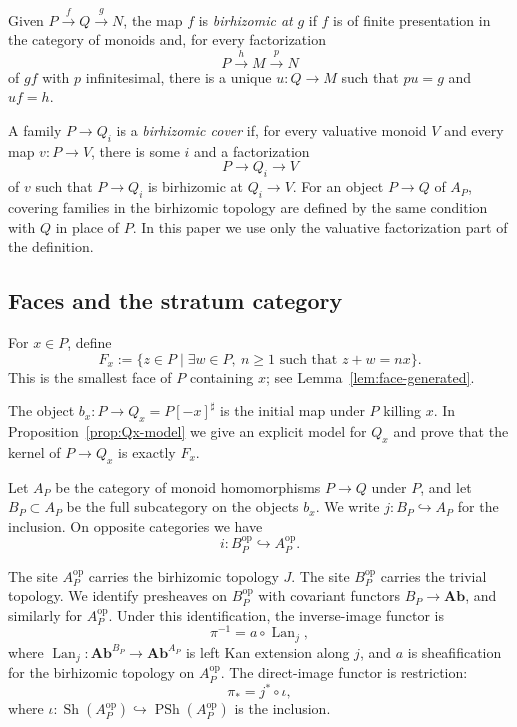 \documentclass[12pt]{article}
\theoremstyle{definition}
\theoremstyle{remark}
\numberwithin{equation}{section}
\newcommand{\op}{\mathrm{op}}
\newcommand{\Ab}{\mathbf{Ab}}
\newcommand{\PSh}{\operatorname{PSh}}
\newcommand{\Sh}{\operatorname{Sh}}
\newcommand{\Lan}{\operatorname{Lan}}
\begin{document}
Given \(P\xrightarrow{f}Q\xrightarrow{g}N\), the map \(f\) is \emph{birhizomic at} \(g\) if \(f\) is of finite presentation in the category of monoids and, for every factorization
\[
P\xrightarrow{h}M\xrightarrow{p}N
\]
of \(gf\) with \(p\) infinitesimal, there is a unique \(u:Q\to M\) such that \(pu=g\) and \(uf=h\).

A family \(P\to Q_i\) is a \emph{birhizomic cover} if, for every valuative monoid \(V\) and every map \(v:P\to V\), there is some \(i\) and a factorization
\[
P\longrightarrow Q_i\longrightarrow V
\]
of \(v\) such that \(P\to Q_i\) is birhizomic at \(Q_i\to V\).  For an object \(P\to Q\) of \(A_P\), covering families in the birhizomic topology are defined by the same condition with \(Q\) in place of \(P\).  In this paper we use only the valuative factorization part of the definition.

\subsection{Faces and the stratum category}

For \(x\in P\), define
\[
F_x := \{z\in P \mid \exists w\in P,\ n\geq 1\text{ such that } z+w=nx\}.
\]
This is the smallest face of \(P\) containing \(x\); see Lemma~\ref{lem:face-generated}.

The object \(b_x:P\to Q_x=P[-x]^\sharp\) is the initial map under \(P\) killing \(x\).  In Proposition~\ref{prop:Qx-model} we give an explicit model for \(Q_x\) and prove that the kernel of \(P\to Q_x\) is exactly \(F_x\).

Let \(A_P\) be the category of monoid homomorphisms \(P\to Q\) under \(P\), and let \(B_P\subset A_P\) be the full subcategory on the objects \(b_x\).  We write \(j:B_P\hookrightarrow A_P\) for the inclusion.  On opposite categories we have
\[
i:B_P^{\op}\hookrightarrow A_P^{\op}.
\]

The site \(A_P^{\op}\) carries the birhizomic topology \(J\).  The site \(B_P^{\op}\) carries the trivial topology.  We identify presheaves on \(B_P^{\op}\) with covariant functors \(B_P\to \Ab\), and similarly for \(A_P^{\op}\).  Under this identification, the inverse-image functor is
\[
\pi^{-1}=a\circ \Lan_j,
\]
where \(\Lan_j:\Ab^{B_P}\to \Ab^{A_P}\) is left Kan extension along \(j\), and \(a\) is sheafification for the birhizomic topology on \(A_P^{\op}\).  The direct-image functor is restriction:
\[
\pi_* = j^*\circ \iota,
\]
where \(\iota:\Sh(A_P^{\op})\hookrightarrow \PSh(A_P^{\op})\) is the inclusion.
\end{document}
